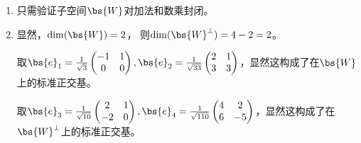 \documentclass[12pt, a4paper, oneside]{ctexbook}
\begin{document}
\section{}
\begin{enumerate}
\item 只需验证子空间$\bs{W}$对加法和数乘封闭。
\item 显然，$\dim(\bs{W})=2$，
则$\dim(\bs{W}^{\perp})=4-2=2$。

取$\bs{e}_1=\frac{1}{\sqrt{3}}\begin{pmatrix}
    -1 & 1\\
    0 & 0
\end{pmatrix},\bs{e}_2=\frac{1}{\sqrt{33}}\begin{pmatrix}
    2 & 1\\
    3 & 3
\end{pmatrix}$，显然这构成了在$\bs{W}$上的标准正交基。

取$\bs{e}_3=\frac{1}{\sqrt{10}}\begin{pmatrix}
    2 & 1\\
    -2 & 0
\end{pmatrix},\bs{e}_4=\frac{1}{\sqrt{110}}\begin{pmatrix}
    4 & 2\\
    6 & -5
\end{pmatrix}$，显然这构成了在$\bs{W}^{\perp}$上的标准正交基。
\end{enumerate}
\end{document}
